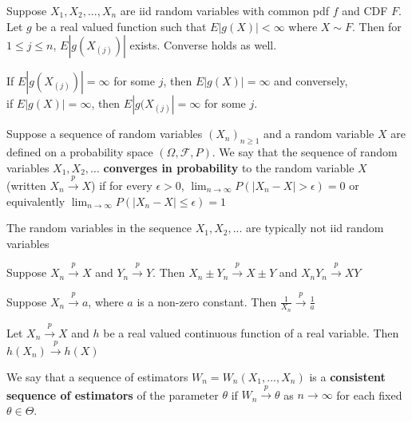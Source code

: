 \begin{thm}
    Suppose $X_1, X_2, ..., X_n$ are iid random variables with common pdf $f$ and CDF $F$. Let $g$ be a real valued function such that $E|g(X)| < \infty$ where $X \sim F$. Then for $1 \leq j \leq n$, $E|g(X_{(j)})|$ exists. Converse holds as well.
\end{thm}

\begin{note}
    If $E|g(X_{(j)})| = \infty$ for some $j$, then $E|g(X)| = \infty$ and conversely, \\if $E|g(X)|=\infty$, then $E|g(X_{(j)}| = \infty$ for some $j$.
\end{note}

\begin{defn}
    Suppose a sequence of random variables $(X_n)_{n \geq 1}$ and a random variable $X$ are defined on a probability space $(\Omega, \mathcal{F}, P)$. We say that the sequence of random variables $X_1, X_2, ...$ \textbf{converges in probability} to the random variable $X$ (written $X_n \overset{p}{\to} X$) if for every $\epsilon > 0$, $ \lim_{n \to \infty} P(|X_n - X| > \epsilon) = 0$ or equivalently $\lim_{n \to \infty} P(|X_n - X| \leq \epsilon) = 1$
\end{defn}

\begin{note}
    The random variables in the sequence $X_1, X_2, ...$ are typically not iid random variables
\end{note}

\begin{thm}
    Suppose $X_n \overset{p}{\to} X$ and $Y_n \overset{p}{\to} Y$. Then $X_n \pm Y_n \overset{p}{\to} X \pm Y$  and $X_n Y_n \overset{p}{\to} XY$
\end{thm}

\begin{thm}
    Suppose $X_n \overset{p}{\to} a$, where $a$ is a non-zero constant. Then $\frac{1}{X_n} \overset{p}{\to} \frac{1}{a}$
\end{thm}

\begin{thm}
    Let $X_n \overset{p}{\to} X$ and $h$ be a real valued continuous function of a real variable. Then $h(X_n) \overset{p}{\to} h(X)$
\end{thm}

\begin{defn}
    We say that a sequence of estimators $W_n = W_n(X_1, ..., X_n)$ is a \textbf{consistent sequence of estimators} of the parameter $\theta$ if $W_n \overset{p}{\to} \theta$ as $n \to \infty$ for each fixed $\theta \in \Theta$.
\end{defn}

